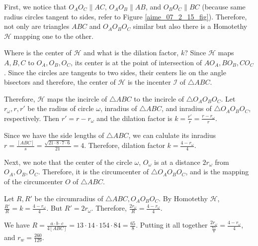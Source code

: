 \documentclass[11pt,twoside]{scrartcl}
\begin{document}
\begin{soln}
    First, we notice that $O_AO_C \parallel AC$, $O_AO_B \parallel AB$, and $O_BO_C \parallel BC$ (because same radius circles tangent to sides, refer to Figure \ref{aime_07_2_15_fig}). Therefore, not only are triangles $ABC$ and $O_AO_BO_C$ similar but also there is a Homotethy $\mathcal{H}$ mapping one to the other. 

    Where is the center of $\mathcal{H}$ and what is the dilation factor, $k$? Since $\mathcal{H}$ maps $A, B, C$ to $O_A, O_B, O_C$, its center is at the point of intersection of $AO_A, BO_B, CO_C$. Since the circles are tangents to two sides, their centers lie on the angle bisectors and therefore, the center of $\mathcal{H}$ is the incenter $\mathcal{I}$ of $\triangle ABC$.

    Therefore, $\mathcal{H}$ maps the incircle of $\triangle ABC$ to the incircle of $\triangle O_AO_BO_C$. Let $r_\omega, r, r'$ be the radius of circle $\omega$, inradius of $\triangle ABC$, and inradius of $\triangle O_AO_BO_C$, respectively. Then $r' = r - r_\omega$ and the dilation factor is $k = \frac{r'}{r} = \frac{r - r_\omega}{r}$.

    Since we have the side lengths of $\triangle{ABC}$, we can calulate its inradius $r = \frac{[ABC]}{s} = \frac{\sqrt{21\cdot8\cdot7\cdot6}}{21} = 4$. Therefore, dilation factor $k = \frac{4-r_\omega}{4}$.

    Next, we note that the center of the circle $\omega$, $O_\omega$ is at a distance $2r_\omega$ from $O_A, O_B, O_C$. Therefore, it is the circumcenter of $\triangle O_AO_BO_C$, and is the mapping of the circumcenter $O$ of $\triangle ABC$.

    Let $R, R'$ be the circumradius of $\triangle ABC, O_AO_BO_C$. By Homotethy $\mathcal{H}$, $\frac{R'}{R} = k = \frac{4-r_\omega}{4}$. But $R' = 2r_\omega$. Therefore, $\frac{2r_\omega}{R} = \frac{4-r_\omega}{4}$.

    We have $R = \frac{a\cdot b\cdot c}{4[ABC]} = {13 \cdot 14 \cdot 15}{4 \cdot 84} = \frac{65}{8}$. Putting it all together $\frac{2r_\omega}{\frac{65}{8}} = \frac{4-r_\omega}{4}$, and $r_w = \boxed{\frac{260}{129}}.$
\end{soln}
\end{document}

